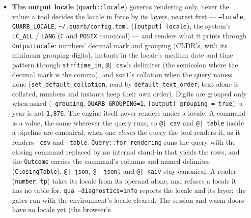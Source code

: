 \documentclass{report}
\begin{document}
\begin{itemize}
  \texttt{ModelAdapter::unit\_scale} answers from the imported
  definitions first (\texttt{kaiv::unit::scale\_with}), then the
  source's own. Loaded at construction, refused by \texttt{check}:
  an unreadable or malformed file, the same file twice, a name
  the table holds already (built in, or an earlier library).
  Unit names are letters in any script (the unital tokenizer
  admits Unicode letters), matched byte for byte as kaiv lists
  them; aliases read as their primary. A quantity prints its unit
  as written. Through kaiv-rs dev (0.15.0, path dependency) until
  kaiv publishes.
\item \textbf{The output locale} (\texttt{quarb::locale}) governs
  rendering only, never the value: a tool decides the locale in
  force by its layers, nearest first — \texttt{--locale},
  \texttt{QUARB\_LOCALE}, \texttt{\textasciitilde/.quarb/config.toml}
  (\texttt{[output] locale}), the system's \texttt{LC\_ALL} /
  \texttt{LANG} (\texttt{C} and \texttt{POSIX} canonical) — and
  renders what it prints through \texttt{OutputLocale}: numbers'
  decimal mark and grouping (CLDR's, with its minimum grouping
  digits), instants in the locale's medium date and time pattern
  through \texttt{strftime\_in}, \texttt{@| csv}'s delimiter (the
  semicolon where the decimal mark is the comma), and
  \texttt{sort}'s collation when the query names none
  (\texttt{set\_default\_collation}, read by
  \texttt{default\_text\_order}; text alone is collated, numbers
  and instants keep their own order). Digits are grouped only
  when asked (\texttt{--grouping}, \texttt{QUARB\_GROUPING=1},
  \texttt{[output] grouping = true}): a year is not
  \texttt{1,876}. The engine itself never renders under a locale.
  A command is a value, the same wherever the query runs, so
  \texttt{@| csv} and \texttt{@| table} inside a pipeline are
  canonical; when one \emph{closes} the query the tool renders
  it, as it renders \texttt{--csv} and \texttt{--table}:
  \texttt{Query::for\_rendering} runs the query with the
  closing command replaced by an internal stand-in that yields the
  rows, and the \texttt{Outcome} carries the command's columns and
  named delimiter (\texttt{ClosingTable}). \texttt{@| json}, \texttt{@| jsonl} and
  \texttt{@| kaiv} stay canonical. A reader
  (\texttt{number}, \texttt{tp}) takes its locale from its operand
  alone, and refuses a locale it has no table for. \texttt{qua --diagnostics=info} reports the locale and its layer;
  the gates run with the environment's locale cleared. The session
  and wasm doors have no locale yet (the browser's

\end{itemize}
\end{document}
